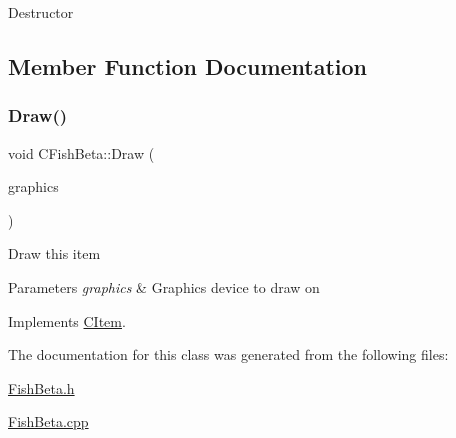 Destructor 

\subsection{Member Function Documentation}
\mbox{\label{class_c_fish_beta_ae2effbff7b98bb3cd6e1070d61d5366e}} 
\subsubsection{\texorpdfstring{Draw()}{Draw()}}
{\footnotesize\ttfamily void C\+Fish\+Beta\+::\+Draw (\begin{DoxyParamCaption}\item[{Gdiplus\+::\+Graphics $\ast$}]{graphics }\end{DoxyParamCaption})\hspace{0.3cm}{\ttfamily [virtual]}}

Draw this item 
\begin{DoxyParams}{Parameters}
{\em graphics} & Graphics device to draw on \\
\hline
\end{DoxyParams}


Implements \mbox{\hyperlink{class_c_item_a7ef8448d0c4bc53d0f1943a4dc817f6f}{C\+Item}}.



The documentation for this class was generated from the following files\+:\begin{DoxyCompactItemize}
\item 
\mbox{\hyperlink{_fish_beta_8h}{Fish\+Beta.\+h}}\item 
\mbox{\hyperlink{_fish_beta_8cpp}{Fish\+Beta.\+cpp}}\end{DoxyCompactItemize}
